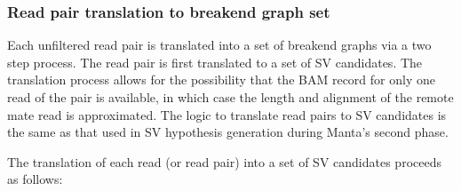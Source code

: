 \documentclass{article}
\begin{document}
\subsubsection{Read pair translation to breakend graph set}
\label{sec:pair2graph}

Each unfiltered read pair is translated into a set of breakend graphs via a two step process. The read pair is first translated to a set of SV candidates. The translation process allows for the possibility that the BAM record for only one read of the pair is available, in which case the length and alignment of the remote mate read is approximated. The logic to translate read pairs to SV candidates is the same as that used in SV hypothesis generation during Manta's second phase.

The translation of each read (or read pair) into a set of SV candidates proceeds as follows:
\end{document}
